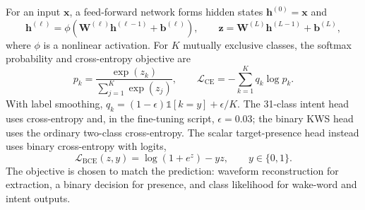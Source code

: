 \begin{table}[H]
  \caption{Neural-network learning and optimization concepts used in the implementation.}
  \centering
  \small
  \label{tab:learning-choices}
\end{table}

For an input $\mathbf{x}$, a feed-forward network forms hidden states $\mathbf{h}^{(0)}=\mathbf{x}$ and
\begin{equation}
  \mathbf{h}^{(\ell)}=\phi\!\left(\mathbf{W}^{(\ell)}\mathbf{h}^{(\ell-1)}+\mathbf{b}^{(\ell)}\right),
  \qquad
  \mathbf{z}=\mathbf{W}^{(L)}\mathbf{h}^{(L-1)}+\mathbf{b}^{(L)},
  \label{eq:feedforward}
\end{equation}
where $\phi$ is a nonlinear activation. For $K$ mutually exclusive classes, the softmax probability and cross-entropy objective are
\begin{equation}
  p_k=\frac{\exp(z_k)}{\sum_{j=1}^{K}\exp(z_j)},\qquad
  \mathcal{L}_{\mathrm{CE}}=-\sum_{k=1}^{K}q_k\log p_k.
  \label{eq:ce}
\end{equation}
With label smoothing, $q_k=(1-\epsilon)\mathbb{1}[k=y]+\epsilon/K$. The 31-class intent head uses cross-entropy and, in the fine-tuning script, $\epsilon=0.03$; the binary KWS head uses the ordinary two-class cross-entropy. The scalar target-presence head instead uses binary cross-entropy with logits,
\begin{equation}
  \mathcal{L}_{\mathrm{BCE}}(z,y)=\log(1+e^z)-yz,\qquad y\in\{0,1\}.
  \label{eq:bce}
\end{equation}
The objective is chosen to match the prediction: waveform reconstruction for extraction, a binary decision for presence, and class likelihood for wake-word and intent outputs.

